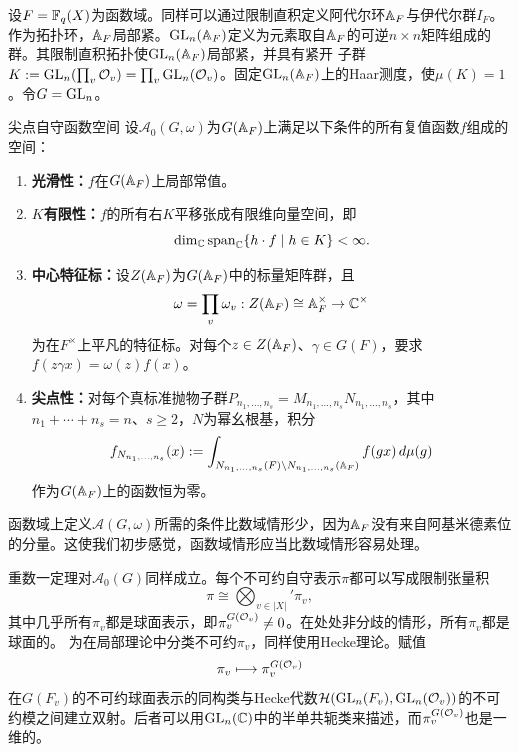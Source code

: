 设$F=\mathbb{F}_q(X)$为函数域。同样可以通过限制直积定义阿代尔环$\mathbb{A}_F$与伊代尔群$I_F$。作为拓扑环，$\mathbb{A}_F$局部紧。$\operatorname{GL}_n(\mathbb{A}_F)$定义为元素取自$\mathbb{A}_F$的可逆$n\times n$矩阵组成的群。其限制直积拓扑使$\operatorname{GL}_n(\mathbb{A}_F)$局部紧，并具有紧开
子群$K:=\operatorname{GL}_n(\prod_v\mathcal O_v)=\prod_v\operatorname{GL}_n(\mathcal O_v)$。固定$\operatorname{GL}_n(\mathbb{A}_F)$上的Haar测度，使$\mu(K)=1$。令$G=\operatorname{GL}_n$。
\begin{definition}{尖点自守函数空间}\label{L9S2O1}
设$\mathcal A_0(G,\omega)$为$G(\mathbb{A}_F)$上满足以下条件的所有复值函数$f$组成的空间：
\begin{enumerate}[label=(\roman*)]
\item \textbf{光滑性：}$f$在$G(\mathbb{A}_F)$上局部常值。
\item \textbf{$K$有限性：}$f$的所有右$K$平移张成有限维向量空间，即
\[\dim_{\mathbb{C}}\operatorname{span}_{\mathbb{C}}\{h\cdot f\mid h\in K\}<\infty.\]
\item \textbf{中心特征标：}设$Z(\mathbb{A}_F)$为$G(\mathbb{A}_F)$中的标量矩阵群，且
\[\omega=\prod_v\omega_v:Z(\mathbb{A}_F)\cong\mathbb{A}_F^\times\to\mathbb{C}^\times\]
为在$F^\times$上平凡的特征标。对每个$z\in Z(\mathbb{A}_F)$、$\gamma\in G(F)$，要求$f(z\gamma x)=\omega(z)f(x)$。
\item \textbf{尖点性：}对每个真标准抛物子群$P_{n_1,\ldots,n_s}=M_{n_1,\ldots,n_s}N_{n_1,\ldots,n_s}$，其中$n_1+\cdots+n_s=n$、$s\geq2$，$N$为幂幺根基，积分
\[f_{N_{n_1,\ldots,n_s}}(x):=\int_{N_{n_1,\ldots,n_s}(F)\backslash N_{n_1,\ldots,n_s}(\mathbb{A}_F)}f(gx)\,d\mu(g)\]
作为$G(\mathbb{A}_F)$上的函数恒为零。
\end{enumerate}
\end{definition}
\begin{note}[L9S2O2]
函数域上定义$\mathcal A(G,\omega)$所需的条件比数域情形少，因为$\mathbb{A}_F$没有来自阿基米德素位的分量。这使我们初步感觉，函数域情形应当比数域情形容易处理。
\end{note}
重数一定理对$\mathcal A_0(G)$同样成立。每个不可约自守表示$\pi$都可以写成限制张量积
\[\pi\cong\bigotimes_{v\in|X|}'\pi_v,\]
其中几乎所有$\pi_v$都是球面表示，即$\pi_v^{G(\mathcal O_v)}\ne0$。在处处非分歧的情形，所有$\pi_v$都是球面的。
为在局部理论中分类不可约$\pi_v$，同样使用Hecke理论。赋值
\[\pi_v\longmapsto\pi_v^{G(\mathcal O_v)}\]
在$G(F_v)$的不可约球面表示的同构类与Hecke代数$\mathcal H(\operatorname{GL}_n(F_v),\operatorname{GL}_n(\mathcal O_v))$的不可约模之间建立双射。后者可以用$\operatorname{GL}_n(\mathbb{C})$中的半单共轭类来描述，而$\pi_v^{G(\mathcal O_v)}$也是一维的。

